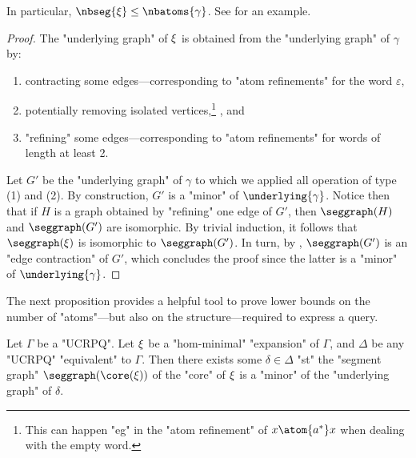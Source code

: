 In particular, $\nbseg{\anexpansion} \leq \nbatoms{\gamma}$.
See  for an example.

\begin{proof}
	The "underlying graph" of $\xi$ is obtained from
	the "underlying graph" of $\gamma$ by:
	\begin{enumerate}
		\item contracting some edges---corresponding to "atom refinements"
			for the word $\varepsilon$,
				 \item potentially removing isolated vertices,\footnote{This can happen "eg" in the "atom refinement" of $x \atom{a^*} x$ when dealing with the empty word.} , and
		\item "refining" some edges---corresponding to "atom refinements"
			for words of length at least 2.
	\end{enumerate}
	Let $G'$ be the "underlying graph" of $\gamma$ to which we applied 
	all operation of type (1) and (2). By construction,
	$G'$ is a "minor" of $\underlying{\gamma}$.
	Notice then that if $H$ is a graph obtained by "refining" one edge of $G'$,
	then $\seggraph(H)$ and $\seggraph(G')$ are isomorphic.
	By trivial induction, it follows that $\seggraph(\anexpansion)$
	is isomorphic to $\seggraph(G')$.
	In turn, by , $\seggraph(G')$
	is an "edge contraction" of $G'$, which concludes the proof
	since the latter is a "minor" of $\underlying{\gamma}$.
\end{proof}

The next proposition provides a helpful tool to prove lower bounds on the
number of "atoms"---but also on the structure---required to express a query.
\AP{}

\begin{theorem}
	\AP\label{thm:structure-theorem}
	Let $\Gamma$ be a "UCRPQ".
	Let $\xi$ be a "hom-minimal" "expansion" of $\Gamma$,
	and $\Delta$ be any "UCRPQ" "equivalent" to $\Gamma$.
	Then there exists some $\delta \in \Delta$ "st" the "segment graph" $\seggraph(\core(\anexpansion))$
	of the "core" of $\xi$ is a "minor" of the "underlying graph" of $\delta$. 
\end{theorem}

